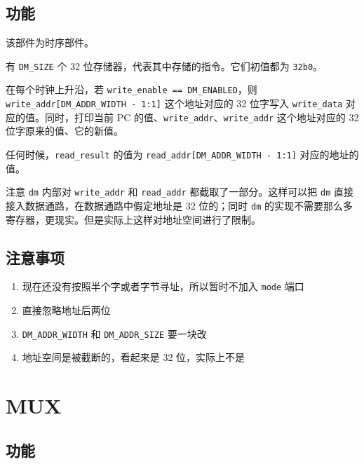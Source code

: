 \documentclass[12pt,AutoFakeBold]{article}
\providecommand{\tightlist}{%
  \setlength{\itemsep}{0pt}\setlength{\parskip}{0pt}}
\begin{document}
\hypertarget{ux529fux80fd-8}{%
\subsection{功能}\label{ux529fux80fd-8}}

该部件为时序部件。

有 \texttt{DM\_SIZE} 个 32 位存储器，代表其中存储的指令。它们初值都为
\texttt{32\textquotesingle{}b0}。

在每个时钟上升沿，若 \texttt{write\_enable\ ==\ DM\_ENABLED}，则
\texttt{write\_addr{[}DM\_ADDR\_WIDTH\ -\ 1:1{]}} 这个地址对应的 32
位字写入 \texttt{write\_data} 对应的值。同时，打印当前 PC
的值、\texttt{write\_addr}、\texttt{write\_addr} 这个地址对应的 32
位字原来的值、它的新值。

任何时候，\texttt{read\_result} 的值为
\texttt{read\_addr{[}DM\_ADDR\_WIDTH\ -\ 1:1{]}} 对应的地址的值。

注意 \texttt{dm} 内部对 \texttt{write\_addr} 和 \texttt{read\_addr}
都截取了一部分。这样可以把 \texttt{dm}
直接接入数据通路，在数据通路中假定地址是 32 位的；同时 \texttt{dm}
的实现不需要那么多寄存器，更现实。但是实际上这样对地址空间进行了限制。

\hypertarget{ux6ce8ux610fux4e8bux9879-5}{%
\subsection{注意事项}\label{ux6ce8ux610fux4e8bux9879-5}}

\begin{enumerate}
\def\labelenumi{\arabic{enumi}.}
\tightlist
\item
  现在还没有按照半个字或者字节寻址，所以暂时不加入 \texttt{mode} 端口
\item
  直接忽略地址后两位
\item
  \texttt{DM\_ADDR\_WIDTH} 和 \texttt{DM\_ADDR\_SIZE} 要一块改
\item
  地址空间是被截断的，看起来是 32 位，实际上不是
\end{enumerate}

\hypertarget{mux}{%
\section{MUX}\label{mux}}

\hypertarget{ux529fux80fd-9}{%
\subsection{功能}\label{ux529fux80fd-9}}
\end{document}
